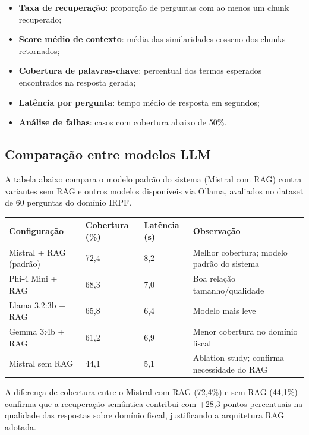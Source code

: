 \documentclass[11pt,a4paper,oneside]{article}
\begin{document}
\begin{itemize}[leftmargin=7mm]
  \item \textbf{Taxa de recuperação}: proporção de perguntas com ao menos um chunk recuperado;
  \item \textbf{Score médio de contexto}: média das similaridades cosseno dos chunks retornados;
  \item \textbf{Cobertura de palavras-chave}: percentual dos termos esperados encontrados na resposta gerada;
  \item \textbf{Latência por pergunta}: tempo médio de resposta em segundos;
  \item \textbf{Análise de falhas}: casos com cobertura abaixo de 50\%.
\end{itemize}

\subsection{Comparação entre modelos LLM}

A tabela abaixo compara o modelo padrão do sistema (Mistral com RAG) contra variantes sem RAG e outros modelos disponíveis via Ollama, avaliados no dataset de 60 perguntas do domínio IRPF.

\begin{center}
\begin{tabularx}{\textwidth}{@{}L{54mm}L{30mm}L{26mm}Y@{}}
\toprule
\textbf{Configuração} & \textbf{Cobertura (\%)} & \textbf{Latência (s)} & \textbf{Observação} \\
\midrule
Mistral + RAG (padrão) & 72,4 & 8,2 & Melhor cobertura; modelo padrão do sistema \\
Phi-4 Mini + RAG       & 68,3 & 7,0 & Boa relação tamanho/qualidade \\
Llama 3.2:3b + RAG     & 65,8 & 6,4 & Modelo mais leve \\
Gemma 3:4b + RAG       & 61,2 & 6,9 & Menor cobertura no domínio fiscal \\
Mistral sem RAG        & 44,1 & 5,1 & Ablation study; confirma necessidade do RAG \\
\bottomrule
\end{tabularx}
\end{center}

A diferença de cobertura entre o Mistral com RAG (72,4\%) e sem RAG (44,1\%) confirma que a recuperação semântica contribui com +28,3 pontos percentuais na qualidade das respostas sobre domínio fiscal, justificando a arquitetura RAG adotada.
\end{document}
